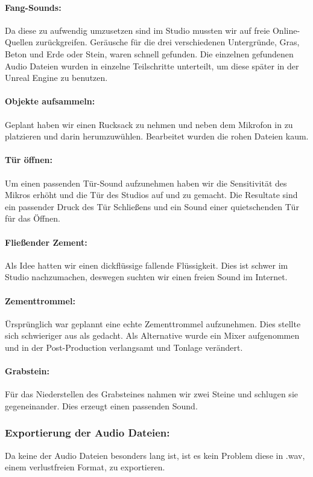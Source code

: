 \paragraph{Fang-Sounds:}
Da diese zu aufwendig umzusetzen sind im Studio mussten wir auf freie Online-Quellen zurückgreifen.
Geräusche für die drei verschiedenen Untergründe, Gras, Beton und Erde oder Stein, waren schnell gefunden.
Die einzelnen gefundenen Audio Dateien wurden in einzelne Teilschritte unterteilt, um diese später in der Unreal Engine zu benutzen.

\paragraph{Objekte aufsammeln:}
Geplant haben wir einen Rucksack zu nehmen und neben dem Mikrofon in zu platzieren und darin herumzuwühlen.
Bearbeitet wurden die rohen Dateien kaum.

\paragraph{Tür öffnen:}
Um einen passenden Tür-Sound aufzunehmen haben wir die Sensitivität des Mikros erhöht und die Tür des Studios auf und
zu gemacht. Die Resultate sind ein passender Druck des Tür Schließens und ein Sound einer quietschenden Tür für das Öffnen.

\paragraph{Fließender Zement:}
Als Idee hatten wir einen dickflüssige fallende Flüssigkeit. Dies ist schwer im Studio nachzumachen,
deswegen suchten wir einen freien Sound im Internet.

\paragraph{Zementtrommel:}
Ürsprünglich war geplannt eine echte Zementtrommel aufzunehmen. Dies stellte sich schwieriger
aus als gedacht. Als Alternative wurde ein Mixer aufgenommen und in der Post-Production verlangsamt und Tonlage verändert.

\paragraph{Grabstein:}
Für das Niederstellen des Grabsteines nahmen wir zwei Steine und schlugen sie gegeneinander. Dies erzeugt einen passenden Sound.

\subsubsection{Exportierung der Audio Dateien:}
Da keine der Audio Dateien besonders lang ist, ist es kein Problem diese in .wav, einem verlustfreien Format, zu exportieren.
